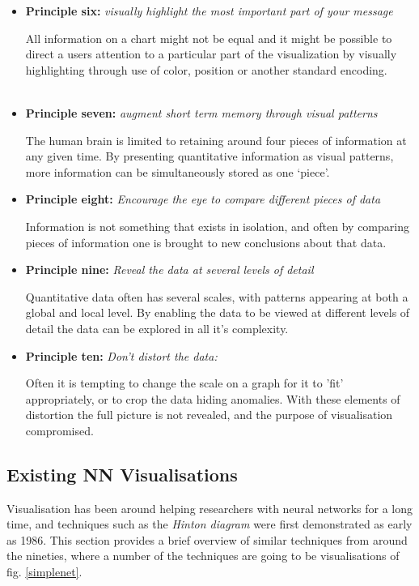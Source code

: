 \documentclass[a4paper,11pt,titlepage]{article}
\begin{document}
\begin{itemize}
		\\\
		\item \textbf{Principle six:} \textit{visually highlight the most important part of your message}
		\par 
		All information on a chart might not be equal and it might be possible to direct a users attention to a particular part of the visualization by visually highlighting through use of color, position or another standard encoding.
		\\\
		\item \textbf{Principle seven:} 
		\textit{augment short term memory through visual patterns}
		\par
		The human brain is limited to retaining around four pieces of information at any given time. By presenting quantitative information as visual patterns, more information can be simultaneously stored as one `piece'.
	\item \textbf{Principle eight:}
	\textit{Encourage the eye to compare different pieces of data}
	\par
	Information is not something that exists in isolation, and often by comparing pieces of information one is brought to new conclusions about that data.
	\item \textbf{Principle nine:}
	\textit{Reveal the data at several levels of detail}
	\par
	Quantitative data often has several scales, with patterns appearing at both a global and local level. By enabling the data to be viewed at different levels of detail the data can be explored in all it's complexity.
	\item \textbf{Principle ten:}
	\textit{Don't distort the data:}
	\par
	Often it is tempting to change the scale on a graph for it to 'fit' appropriately, or to crop the data hiding anomalies. With these elements of distortion the full picture is not revealed, and the purpose of visualisation compromised. 
	\end{itemize}
\subsection{Existing NN Visualisations}
		
	 Visualisation has been around helping researchers with neural networks for a long time, and techniques such as the \textit{Hinton diagram} were first demonstrated as early as 1986. This section provides a brief overview of similar techniques from around the nineties, where a number of the techniques are going to be visualisations of fig. \ref{simplenet}.
	 
\end{document}
